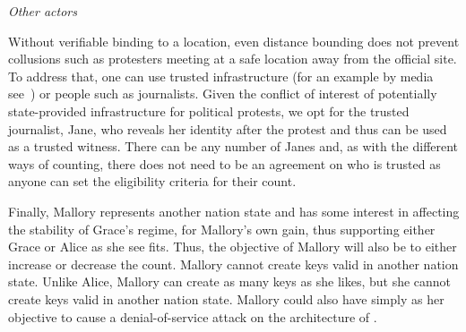 \emph{Other actors}

Without verifiable binding to a location, even distance bounding does
not prevent collusions such as protesters meeting at a safe location
away from the official site. To address that, one can use trusted
infrastructure (for an example by media see~\cite{LeMondeProtestingSolution}) or people
such as journalists. Given the conflict of interest of potentially
state-provided infrastructure for political protests, we opt for the
trusted journalist, Jane, who reveals her identity after the protest
and thus can be used as a trusted witness. There can be any number of
Janes and, as with the different ways of counting, there does not need
to be an agreement on who is trusted as anyone can set the eligibility
criteria for their count.

Finally, Mallory represents another nation state and has some interest
in affecting the stability of Grace's regime, for Mallory's own gain,
thus supporting either Grace or Alice as she see fits.  Thus, the
objective of Mallory will also be to either increase or decrease the
count. Mallory cannot create keys valid in another nation
state. Unlike Alice, Mallory can create as many keys as she likes, but
she cannot create keys valid in another nation state. Mallory could
also have simply as her objective to cause a denial-of-service attack
on the architecture of \PRIVO.



